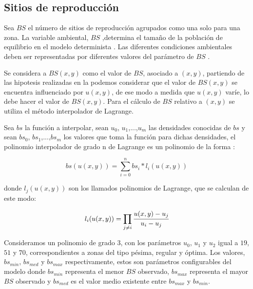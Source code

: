 \subsection{Sitios de reproducción}
\label{subsec:cap4-sitios de reproduccion}
Sea $BS$ el número de sitios de reproducción agrupados como una solo para una zona. La variable
ambiental, $BS$ ,determina el tamaño de la población de equilibrio en el modelo determinista
\cite{otero2006stochastic}. Las diferentes condiciones ambientales deben ser
representadas por diferentes valores del parámetro de $BS$ \cite{otero2006stochastic}.

Se considera a $BS(x,y)$ como el valor de $BS$, asociado a $(x,y)$, partiendo de las hipotesis
realizadas en la  podemos considerar que el valor de $BS(x,y)$ se
encuentra influenciado por $u(x,y)$, de ese modo a medida que $u(x,y)$ varíe, lo debe hacer el
valor de $BS(x,y)$. Para el cálculo de $BS$ relativo a $(x,y)$ se utiliza el método interpolador
de Lagrange.

Sea $bs$ la función a interpolar, sean $u_0$, $u_1$,...,$u_m$ las densidades conocidas de $bs$ y
sean $bs_0$, $bs_1$,...,$bs_m$ los valores que toma la función para dichas densidades, el polinomio interpolador de grado n de Lagrange es un polinomio de la forma :

\begin{equation}
\label{eq:sitios-reproduccion-x-y}
    bs(u(x,y)) = \sum_{i=0}^{n} bs_{i} * l_{i}(u(x,y))
\end{equation}

donde $l_j(u(x,y))$ son los llamados polinomios de Lagrange, que se calculan de este modo:

\begin{equation}
\label{eq:sitios-reproduccion-x-y}
    l_{i}(u(x,y)) = \prod_{j \neq i} \cfrac{u(x,y) - u_{j}}{u_{i} - u_{j}}
\end{equation}

Consideramos un polinomio de grado 3, con los parámetros $u_0$, $u_1$ y $u_2$ igual a $19$, $51$ y
$70$, correspondientes a zonas del tipo pésima, regular y óptima. Los valores, $bs_{min}$,
$bs_{med}$ y $bs_{max}$ respectivamente, estos son parámetros configurables del modelo
donde $bs_{min}$ representa el menor $BS$ observado, $bs_{max}$ representa el mayor $BS$ observado
y  $bs_{med}$ es el valor medio existente entre $bs_{max}$ y $bs_{min}$.
